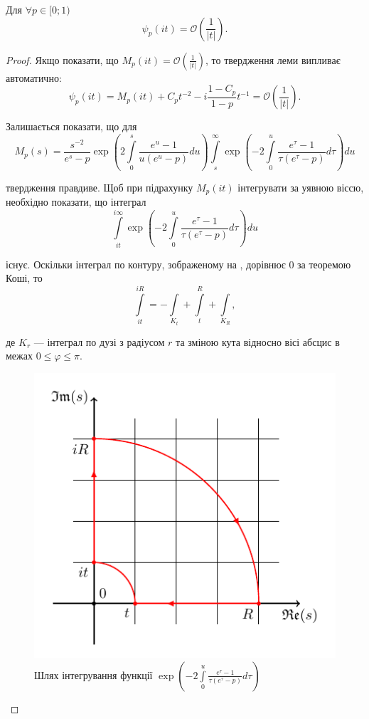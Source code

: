 \begin{lem}
\label{lem:psi_im_ax_asympt}
Для $\forall p \in [0; 1)$
\begin{equation}
\psi_{p}(it) = \mathcal{O}\left(\frac{1}{|t|}\right).
\end{equation}
\begin{proof}
Якщо показати, що $M_{p}(it) = \mathcal{O}\left(\frac{1}{|t|}\right)$, то твердження леми випливає автоматично:
\begin{equation*}
\psi_{p}(it)=M_{p}(it) + C_{p} t^{-2} - i \frac{1-C_{p}}{1 - p} t^{-1} = \mathcal{O}\left(\frac{1}{|t|}\right).
\end{equation*}

Залишається показати, що для
\begin{equation*}
M_{p}(s) = \frac{s^{-2}}{e^s-p} \exp \left(2 \int\limits_{0}^{s} \frac{e^u -1}{u(e^u - p)} du\right) \int\limits_s^\infty \exp\left(-2 \int\limits_{0}^{u} \frac{e^\tau -1}{\tau(e^\tau - p)} d\tau\right) du 
\end{equation*}

твердження правдиве. Щоб при підрахунку $M_{p}(it)$ інтегрувати за уявною віссю, необхідно показати, що інтеграл
\begin{equation*}
\int\limits_{it}^{i\infty} \exp\left(-2 \int\limits_{0}^{u} \frac{e^\tau -1}{\tau(e^\tau - p)} d\tau\right) du 
\end{equation*}

існує. Оскільки інтеграл по контуру, зображеному на , дорівнює 0 за теоремою Коші, то
\begin{equation*}
\int\limits_{it}^{iR} = -\int\limits_{K_{t}} + \int\limits_{t}^{R} + \int\limits_{K_{R}},
\end{equation*}

де $K_{r}$ --- інтеграл по дузі з радіусом $r$ та зміною кута відносно вісі абсцис в межах $0 \leq \varphi \leq \pi$.
\begin{figure}[h]
	\centering
	\includegraphics{chapter_Asymptotics/img/contour_quarter}
	\caption{Шлях інтегрування функції $\exp\left(-2 \int\limits_{0}^{u} \frac{e^\tau -1}{\tau(e^\tau - p)} d\tau\right)$}
	\label{fig:contour_phi}
\end{figure}


\end{proof}
\end{lem}
